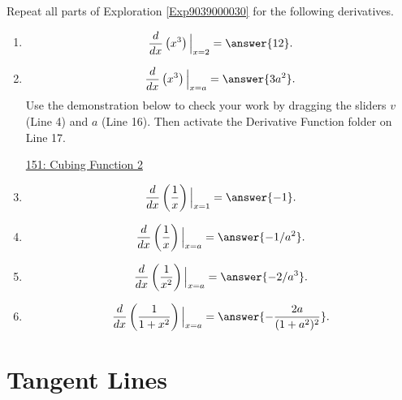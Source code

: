 \documentclass{ximera}
\begin{document}
\begin{exploration} \label{Exp4354567778}
Repeat all parts of Exploration \ref{Exp9039000030} for the following derivatives.

\begin{enumerate}
\item 
\[
      \frac{d}{dx}\left( x^3 \right)\Big|_{x=2} = \answer{12} .
\]

\item
\[
      \frac{d}{dx}\left( x^3 \right)\Big|_{x=a} = \answer{3a^2} .
\]
Use the demonstration below to check your work by dragging the sliders $v$ (Line 4) and $a$ (Line 16). Then activate the Derivative Function folder on Line 17.

\begin{onlineOnly}
    \begin{center}
\end{center}
\end{onlineOnly}

\href{https://www.desmos.com/calculator/ewy7jqij6s}{151: Cubing Function 2}




\item
\[
      \frac{d}{dx}\left( \frac{1}{x} \right)\Big|_{x=1} = \answer{-1} .
\]

\item
\[
      \frac{d}{dx}\left(\frac{1}{x} \right)\Big|_{x=a} = \answer{-1/a^2} .
\]

\item
\[
      \frac{d}{dx}\left(\frac{1}{x^2} \right)\Big|_{x=a} = \answer{-2/a^3} .
\]

\item
\[
      \frac{d}{dx}\left(\frac{1}{1+x^2} \right)\Big|_{x=a} = \answer{-\frac{2a}{(1+a^2)^2}} .
\]

\end{enumerate}

\end{exploration}


\section{Tangent Lines}
\end{document}
